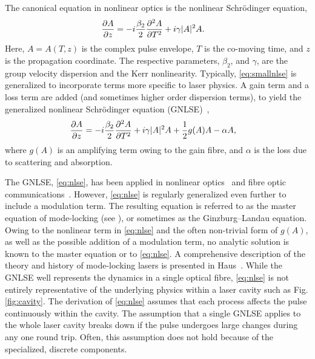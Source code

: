 \documentclass[9pt,twocolumn,twoside]{osajnl}
\newcommand{\pdiff}[3][\hspace{-0.5pt}]{\frac{\partial^{#1}#2}{\partial{#3}^{#1}}} %
\begin{document}
The canonical equation in nonlinear optics is the nonlinear Schr\"odinger equation,
\begin{align}
	\pdiff{A}{z} &= - i \frac{\beta_2}{2}\pdiff[2]{A}{T} + i \gamma |A|^2 A.
	\label{eq:smallnlse}
\end{align}
Here, $A = A(T, z)$ is the complex pulse envelope, $T$ is the co-moving time, and $z$ is the propagation coordinate. The respective parameters, $\beta_2$, and $\gamma$, are the group velocity dispersion and the Kerr nonlinearity. Typically, \eqref{eq:smallnlse} is generalized to incorporate terms more specific to laser physics. A gain term and a loss term are added (and sometimes higher order dispersion terms), to yield the generalized nonlinear Schr\"odinger equation (GNLSE)~\cite{agrawal2013, bohun2015, finot2008, peng2018, shtyrina2017, yarutkina2013},
	\begin{align}
	\pdiff{A}{z} &= - i \frac{\beta_2}{2}\pdiff[2]{A}{T} + i \gamma |A|^2 A + \frac{1}{2}g(A) A - \alpha A,
	\label{eq:nlse}
\end{align}
where $g(A)$ is an amplifying term owing to the gain fibre, and $\alpha$ is the loss due to scattering and absorption.

The GNLSE, \eqref{eq:nlse}, has been applied in nonlinear optics~\cite{agrawal2013} and fibre optic communications~\cite{agrawal2002}. However, \eqref{eq:nlse} is regularly generalized even further to include a modulation term. The resulting equation is referred to as the master equation of mode-locking (see \cite{haus1975, haus1984, haus2000, tamura1996, usechak2005}), or sometimes as the Ginzburg--Landau equation. Owing to the nonlinear term in \eqref{eq:nlse} and the often non-trivial form of $g(A)$, as well as the possible addition of a modulation term, no analytic solution is known to the master equation or to \eqref{eq:nlse}. A comprehensive description of the theory and history of mode-locking lasers is presented in Haus~\cite{haus2000}. While the GNLSE well represents the dynamics in a single optical fibre, \eqref{eq:nlse} is not entirely representative of the underlying physics within a laser cavity such as Fig. \ref{fig:cavity}. The derivation of \eqref{eq:nlse} assumes that each process affects the pulse continuously within the cavity. The assumption that a single GNLSE applies to the whole laser cavity breaks down if the pulse undergoes large changes during any one round trip. Often, this assumption does not hold because of the specialized, discrete components.
\end{document}
